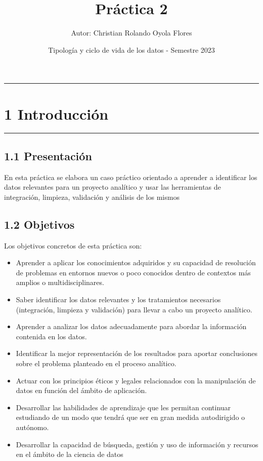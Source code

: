 \documentclass[
]{article}
\title{Práctica 2}
\author{Autor: Christian Rolando Oyola Flores}
\date{Tipología y ciclo de vida de los datos - Semestre 2023}
\providecommand{\tightlist}{%
  \setlength{\itemsep}{0pt}\setlength{\parskip}{0pt}}
\begin{document}
\maketitle

{
\setcounter{tocdepth}{2}
\tableofcontents
}
\begin{center}\rule{0.5\linewidth}{0.5pt}\end{center}

\hypertarget{introducciuxf3n}{%
\section{1 Introducción}\label{introducciuxf3n}}

\begin{center}\rule{0.5\linewidth}{0.5pt}\end{center}

\hypertarget{presentaciuxf3n}{%
\subsection{1.1 Presentación}\label{presentaciuxf3n}}

En esta práctica se elabora un caso práctico orientado a aprender a
identificar los datos relevantes para un proyecto analítico y usar las
herramientas de integración, limpieza, validación y análisis de los
mismos

\hypertarget{objetivos}{%
\subsection{1.2 Objetivos}\label{objetivos}}

Los objetivos concretos de esta práctica son:

\begin{itemize}
\tightlist
\item
  Aprender a aplicar los conocimientos adquiridos y su capacidad de
  resolución de problemas en entornos nuevos o poco conocidos dentro de
  contextos más amplios o multidisciplinares.
\item
  Saber identificar los datos relevantes y los tratamientos necesarios
  (integración, limpieza y validación) para llevar a cabo un proyecto
  analítico.
\item
  Aprender a analizar los datos adecuadamente para abordar la
  información contenida en los datos.
\item
  Identificar la mejor representación de los resultados para aportar
  conclusiones sobre el problema planteado en el proceso analítico.
\item
  Actuar con los principios éticos y legales relacionados con la
  manipulación de datos en función del ámbito de aplicación.
\item
  Desarrollar las habilidades de aprendizaje que les permitan continuar
  estudiando de un modo que tendrá que ser en gran medida autodirigido o
  autónomo.
\item
  Desarrollar la capacidad de búsqueda, gestión y uso de información y
  recursos en el ámbito de la ciencia de datos
\end{itemize}
\end{document}
